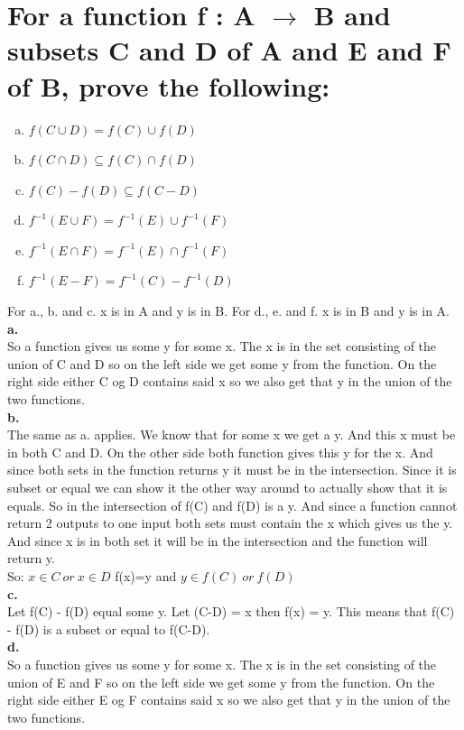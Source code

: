 \section{For a function f : A $\rightarrow$ B and subsets C and D of A and E and F of B, prove the following:}
\begin{enumerate}[a.]
\item $f(C \cup D) = f(C) \cup f(D)$
\item $f(C \cap D) \subseteq f(C) \cap f(D)$
\item $f(C) - f(D) \subseteq f(C-D)$
\item $f^{-1}(E \cup F) = f^{-1}(E) \cup f^{-1}(F)$
\item $f^{-1}(E \cap F) = f^{-1}(E) \cap f^{-1}(F)$
\item $f^{-1}(E - F) = f^{-1}(C) - f^{-1}(D)$
\end{enumerate}
For a., b. and c. x is in A and y is in B. For d., e. and f. x is in B and y is in A.\\
\textbf{a.}\\ So a function gives us some y for some x. The x is in the set consisting of the union of C and D so on the left side we get some y from the function. On the right side either C og D contains said x so we also get that y in the union of the two functions.\\
\textbf{b.}\\ The same as a. applies. We know that for some x we get a y. And this x must be in both C and D. On the other side both function gives this y for the x. And since both sets in the function returns y it must be in the intersection. Since it is subset or equal we can show it the other way around to actually show that it is equals. So in the intersection of f(C) and f(D) is a y. And since a function cannot return 2 outputs to one input both sets must contain the x which gives us the y. And since x is in both set it will be in the intersection and the function will return y.\\
So: $x\in C \ or\ x \in D$ f(x)=y and $y\in f(C)\ or\ f(D)$\\
\textbf{c.}\\
Let f(C) - f(D) equal some y. Let (C-D) = x then f(x) = y. This means that f(C) - f(D) is a subset or equal to f(C-D).\\
\textbf{d.}\\
So a function gives us some y for some x. The x is in the set consisting of the union of E and F so on the left side we get some y from the function. On the right side either E og F contains said x so we also get that y in the union of the two functions.\\

